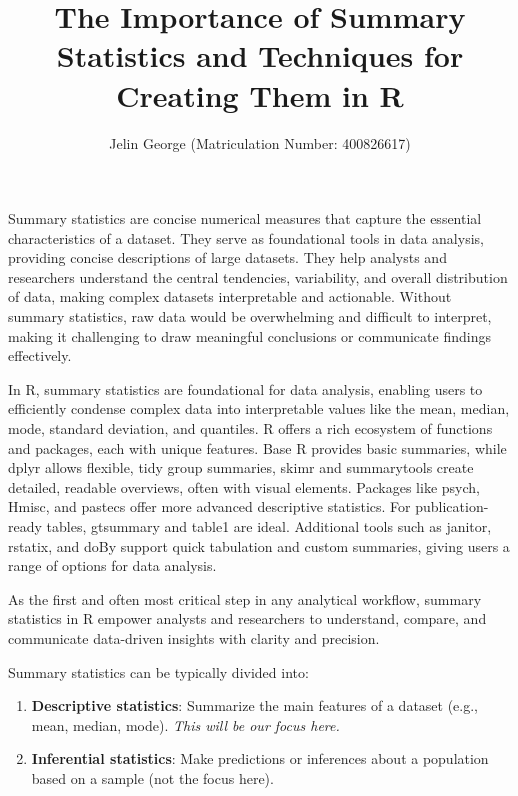 \documentclass[
  man,
  floatsintext,
  longtable,
  nolmodern,
  notxfonts,
  notimes,
  colorlinks=true,linkcolor=blue,citecolor=blue,urlcolor=blue]{apa7}
\title{The Importance of Summary Statistics and Techniques for Creating
Them in R}
\author{Jelin George (Matriculation Number: 400826617)}
\affiliation{
{Hochschule Fresenius - University of Applied Science}}
\begin{document}
\maketitle


\setcounter{secnumdepth}{-\maxdimen} %

\setlength\LTleft{0pt}


Summary statistics are concise numerical measures that capture the
essential characteristics of a dataset. They serve as foundational tools
in data analysis, providing concise descriptions of large datasets. They
help analysts and researchers understand the central tendencies,
variability, and overall distribution of data, making complex datasets
interpretable and actionable. Without summary statistics, raw data would
be overwhelming and difficult to interpret, making it challenging to
draw meaningful conclusions or communicate findings effectively.

In R, summary statistics are foundational for data analysis, enabling
users to efficiently condense complex data into interpretable values
like the mean, median, mode, standard deviation, and quantiles. R offers
a rich ecosystem of functions and packages, each with unique features.
Base R provides basic summaries, while dplyr allows flexible, tidy group
summaries, skimr and summarytools create detailed, readable overviews,
often with visual elements. Packages like psych, Hmisc, and pastecs
offer more advanced descriptive statistics. For publication-ready
tables, gtsummary and table1 are ideal. Additional tools such as
janitor, rstatix, and doBy support quick tabulation and custom
summaries, giving users a range of options for data analysis.

As the first and often most critical step in any analytical workflow,
summary statistics in R empower analysts and researchers to understand,
compare, and communicate data-driven insights with clarity and
precision.

Summary statistics can be typically divided into:

\begin{enumerate}
\def\labelenumi{\arabic{enumi}.}
\item
  \textbf{Descriptive statistics}: Summarize the main features of a
  dataset (e.g., mean, median, mode). \emph{This will be our focus
  here.}
\item
  \textbf{Inferential statistics}: Make predictions or inferences about
  a population based on a sample (not the focus here).
\end{enumerate}
\end{document}
